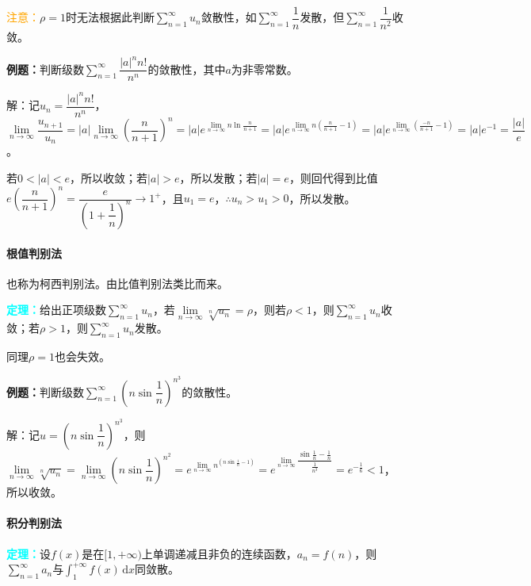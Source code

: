 \documentclass[UTF8, 12pt]{ctexart}
\begin{document}
        \textcolor{orange}{注意：}$\rho=1$时无法根据此判断$\sum\limits_{n=1}^\infty u_n$敛散性，如$\sum\limits_{n=1}^\infty\dfrac{1}{n}$发散，但$\sum\limits_{n=1}^\infty\dfrac{1}{n^2}$收敛。

        \textbf{例题：}判断级数$\sum\limits_{n=1}^\infty\dfrac{\vert a\vert^nn!}{n^n}$的敛散性，其中$a$为非零常数。

        解：记$u_n=\dfrac{\vert a\vert^nn!}{n^n}$，$\lim\limits_{n\to\infty}\dfrac{u_{n+1}}{u_n}=\vert a\vert\lim\limits_{n\to\infty}\left(\dfrac{n}{n+1}\right)^n=\vert a\vert e^{\lim\limits_{n\to\infty}n\ln\frac{n}{n+1}}=\vert a\vert e^{\lim\limits_{n\to\infty}n(\frac{n}{n+1}-1)}=\vert a\vert e^{\lim\limits_{n\to\infty}(\frac{-n}{n+1}-1)}=\vert a\vert e^{-1}=\dfrac{\vert a\vert}{e}$。

        若$0<\vert a\vert<e$，所以收敛；若$\vert a\vert>e$，所以发散；若$\vert a\vert=e$，则回代得到比值$e\left(\dfrac{n}{n+1}\right)^n=\dfrac{e}{(1+\dfrac{1}{n})^n}\to1^+$，且$u_1=e$，$\therefore u_n>u_1>0$，所以发散。

        \paragraph{根值判别法} \leavevmode \medskip

        也称为柯西判别法。由比值判别法类比而来。

        \textcolor{aqua}{\textbf{定理：}}给出正项级数$\sum\limits_{n=1}^\infty u_n$，若$\lim\limits_{n\to\infty}\sqrt[n]{u_n}=\rho$，则若$\rho<1$，则$\sum\limits_{n=1}^\infty u_n$收敛；若$\rho>1$，则$\sum\limits_{n=1}^\infty u_n$发散。

        同理$\rho=1$也会失效。

        \textbf{例题：}判断级数$\sum\limits_{n=1}^\infty\left(n\sin\dfrac{1}{n}\right)^{n^3}$的敛散性。

        解：记$u=\left(n\sin\dfrac{1}{n}\right)^{n^3}$，则$\lim\limits_{n\to\infty}\sqrt[n]{u_n}=\lim\limits_{n\to\infty}\left(n\sin\dfrac{1}{n}\right)^{n^2}=e^{\lim\limits_{n\to\infty}n^(n\sin\frac{1}{n}-1)}=e^{\lim\limits_{n\to\infty}\dfrac{\sin\frac{1}{n}-\frac{1}{n}}{\frac{1}{n^3}}}=e^{-\frac{1}{6}}<1$，所以收敛。

        \paragraph{积分判别法} \leavevmode \medskip

        \textcolor{aqua}{\textbf{定理：}}设$f(x)$是在$[1,+\infty)$上单调递减且非负的连续函数，$a_n=f(n)$，则$\sum\limits_{n=1}^\infty a_n$与$\int_1^{+\infty}f(x)\,\textrm{d}x$同敛散。
\end{document}
